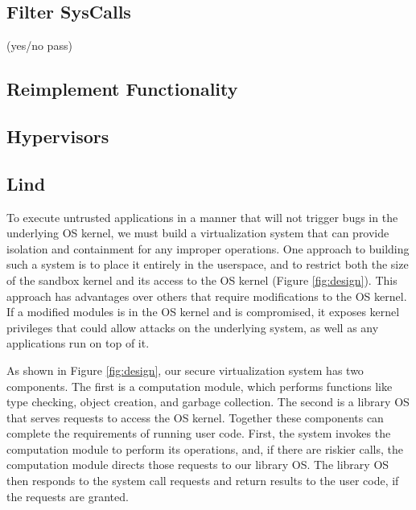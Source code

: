 {\subsection{Filter SysCalls}
(yes/no pass)

\subsection {Reimplement Functionality}

\subsection {Hypervisors}

\subsection {Lind}

To execute untrusted applications in a manner that will not trigger bugs
in the underlying OS kernel, %
we must build a virtualization system that can provide isolation and
containment for any improper operations.
One approach to building such a system is to place it entirely in the userspace,
and to restrict both the size of the sandbox kernel and its access to the
OS kernel (Figure \ref{fig:design}).
This approach has advantages over others that require modifications to
the OS kernel. 
If a modified modules is in the OS kernel and is compromised, it exposes 
kernel privileges that could allow attacks
on the underlying system, as well as any applications run on top of it.

As shown in Figure \ref{fig:design}, our secure virtualization system
has two components.
The first is a computation module, which performs functions like type checking,
object creation, and garbage collection. 
The second is a library OS that
serves requests to access the OS kernel.
Together these components can complete the requirements of running user code.
First, the system invokes the computation module to perform its operations,
and, if there are riskier calls, the computation module directs those requests to our
library OS. The library OS then responds to the system call requests and
return results to the user code, if the requests are granted.

}
